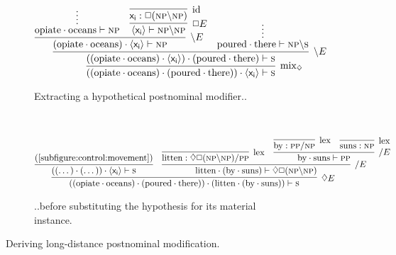 \begin{figure}
	\centering
	\begin{subfigure}{1\textwidth}
		\smaller
		\[
			\infer[\rulestyle{mix}_{\diamond}]{((\w{opiate}\sbind\w{oceans})\sbind(\w{poured}\sbind\w{there}))\sbind\bracket{\term{x_i }} \vdash \s}{
				\infer[\divleft E]{((\w{opiate}\sbind\w{oceans})\sbind\bracket{\term{x_i }})\sbind(\w{poured}\sbind\w{there}) \vdash \s}{
					\infer[\divleft E]{(\w{opiate}\sbind\w{oceans})\sbind\bracket{\term{x_i }} \vdash \np}{
						\infer*{\w{opiate}\sbind\w{oceans} \vdash \np}{}
						&
						\infer[\Box E]{\bracket{\term{x_i }} \vdash \np\divleft\np}{
							\infer[\Ax]{\term{x_i }: \Box (\np\divleft\np)}{}
						}
					}
					&
					\infer*{\w{poured}\sbind\w{there} \vdash \np\divleft\s}{}
				}
			}
		\]
		\caption{Extracting a hypothetical postnominal modifier..}
		\label{subfigure:control:movement}
	\end{subfigure}\\[\midsep]
	\begin{subfigure}{1\textwidth}
	\centering
		\smaller
		\[
			\infer[\diamond E]{((\w{opiate}\sbind\w{oceans})\sbind(\w{poured}\sbind\w{there}))\sbind(\w{litten}\sbind(\w{by}\sbind\w{suns})) \vdash \s}{
				\infer{((\dots)\sbind(\dots))\sbind\bracket{\term{x_i }} \vdash \s}{\text{(\ref{subfigure:control:movement})}}
				&
				\infer[\divright E]{\w{litten}\sbind(\w{by}\sbind\w{suns}) \vdash \diamond\Box(\np\divleft\np)}{
					\infer[\Lex]{\w{litten} : \diamond\Box(\np\divleft\np)\divright\pp }{}
					&
					\infer[\divright E]{\w{by}\sbind\w{suns} \vdash \pp}{
						\infer[\Lex]{\w{by}: \pp\divright\np}{}
						&
						\infer[\Lex]{\w{suns}: \np}{}
					}
				}
			}
		\]
		\caption{..before substituting the hypothesis for its material instance.}
		\label{subfigure:control:substitution}
	\end{subfigure}
	\caption{Deriving long-distance postnominal modification.}
	\label{figure:lovecraft_postnominal}
\end{figure}


